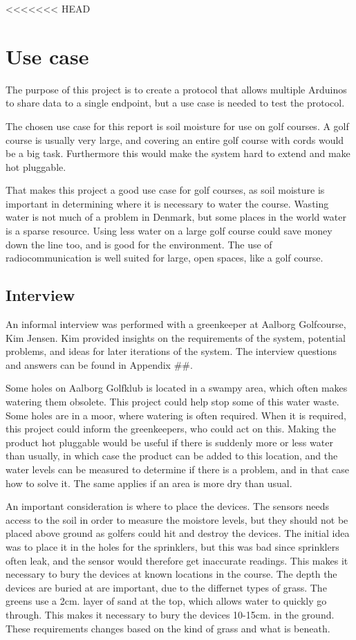 <<<<<<< HEAD
\chapter{Use case}
The purpose of this project is to create a protocol that allows multiple Arduinos to share data to a single endpoint, but a use case is needed to test the protocol.

The chosen use case for this report is soil moisture for use on golf courses. A golf course is usually very large, and covering an entire golf course with cords would be a big task. Furthermore this would make the system hard to extend and make hot pluggable.

That makes this project a good use case for golf courses, as soil moisture is important in determining where it is necessary to water the course. Wasting water is not much of a problem in Denmark, but some places in the world water is a sparse resource. Using less water on a large golf course could save money down the line too, and is good for the environment. The use of radiocommunication is well suited for large, open spaces, like a golf course.

\section{Interview}
An informal interview was performed with a greenkeeper at Aalborg Golfcourse, Kim Jensen. Kim provided insights on the requirements of the system, potential problems, and ideas for later iterations of the system. The interview questions and answers can be found in Appendix \#\#. 

Some holes on Aalborg Golfklub is located in a swampy area, which often makes watering them obsolete. This project could help stop some of this water waste. Some holes are in a moor, where watering is often required. When it is required, this project could inform the greenkeepers, who could act on this.
Making the product hot pluggable would be useful if there is suddenly more or less water than usually, in which case the product can be added to this location, and the water levels can be measured to determine if there is a problem, and in that case how to solve it. The same applies if an area is more dry than usual.

An important consideration is where to place the devices. The sensors needs access to the soil in order to measure the moistore levels, but they should not be placed above ground as golfers could hit and destroy the devices. The initial idea was to place it in the holes for the sprinklers, but this was bad since sprinklers often leak, and the sensor would therefore get inaccurate readings.
This makes it necessary to bury the devices at known locations in the course. The depth the devices are buried at are important, due to the differnet types of grass. The greens use a 2cm. layer of sand at the top, which allows water to quickly go through. This makes it necessary to bury the devices 10-15cm. in the ground. These requirements changes based on the kind of grass and what is beneath.

